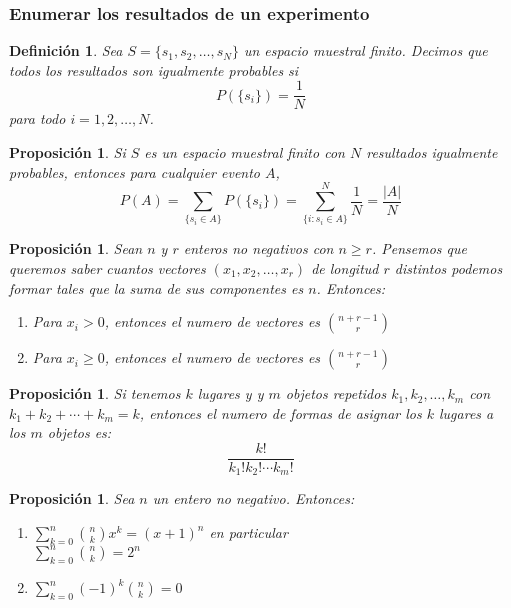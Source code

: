 \documentclass[14pt]{extarticle}
\newtheorem{proposition}[theorem]{Proposición}
\newtheorem{definition}[theorem]{Definición}
\begin{document}
\subsubsection{Enumerar los resultados de un experimento}

\begin{definition}
    Sea $S = \{s_1, s_2, \ldots, s_N\}$ un espacio muestral finito. Decimos que todos los resultados 
    son igualmente probables si $$P(\{s_i\}) = \frac{1}{N}$$ para todo $i = 1, 2, \ldots, N$.
\end{definition}

\begin{proposition}
    Si $S$ es un espacio muestral finito con $N$ resultados igualmente probables, entonces para cualquier evento $A$,
    \[
        P(A) = \sum_{\{s_i \in A\}} P(\{s_i\}) = \sum_{\{i: s_i \in A\}}^N \frac{1}{N} = \frac{|A|}{N}
    \]
\end{proposition}

\begin{proposition}
    Sean $n$ y $r$ enteros no negativos con $n \geq r$. Pensemos que queremos saber cuantos vectores $(x_1, x_2, \ldots, x_r)$ de longitud $r$ distintos
    podemos formar tales que la suma de sus componentes es $n$. Entonces:
    \begin{enumerate}
        \item Para $x_i > 0$, entonces el numero de vectores es $\binom{n+r-1}{r}$
        \item Para $x_i \geq 0$, entonces el numero de vectores es $\binom{n+r-1}{r}$
    \end{enumerate}
\end{proposition}
    
\begin{proposition}
    Si tenemos $k$ lugares y y $m$ objetos repetidos $k_1, k_2, \ldots, k_m$ con $k_1 + k_2 + \cdots + k_m = k$, entonces
    el numero de formas de asignar los $k$ lugares a los $m$ objetos es:
    \[
        \frac{k!}{k_1! k_2! \cdots k_m!}
    \]
\end{proposition}

\begin{proposition}
    Sea $n$ un entero no negativo. Entonces:
    \begin{enumerate}
        \item $\sum_{k=0}^n \binom{n}{k}x^k = (x+1)^n$ en particular\\ $\sum_{k=0}^n \binom{n}{k} = 2^n$
        \item $\sum_{k=0}^n (-1)^k \binom{n}{k} = 0$
    \end{enumerate}
\end{proposition}
\end{document}
